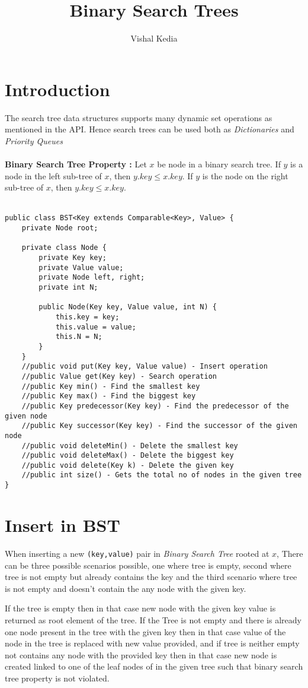 \documentclass[12pt,a4paper,draft]{article}
\author{Vishal Kedia}
\title{Binary Search Trees}
\begin{document}
\maketitle
\section{Introduction}
The search tree data structures supports many dynamic set operations as mentioned in the API. Hence search trees can be used both as \emph{Dictionaries} and \emph{Priority Queues}
\\
\\
\textbf{Binary Search Tree Property :} Let $x$ be node in a binary search tree. If $y$ is a node in the left sub-tree of $x$, then $y.key \leq x.key$. If $y$ is the node on the right sub-tree of $x$, then $y.key \leq x.key$.
\\
\\
\begin{lstlisting}[caption={Binary Search Tree API}]
public class BST<Key extends Comparable<Key>, Value> {
	private Node root;

	private class Node {
		private Key key;
		private Value value;
		private Node left, right;
		private int N;

		public Node(Key key, Value value, int N) {
			this.key = key;
			this.value = value;
			this.N = N;
		}
	}
	//public void put(Key key, Value value) - Insert operation
	//public Value get(Key key) - Search operation
	//public Key min() - Find the smallest key
	//public Key max() - Find the biggest key
	//public Key predecessor(Key key) - Find the predecessor of the given node
	//public Key successor(Key key) - Find the successor of the given node
	//public void deleteMin() - Delete the smallest key
	//public void deleteMax() - Delete the biggest key
	//public void delete(Key k) - Delete the given key
	//public int size() - Gets the total no of nodes in the given tree
}
\end{lstlisting}
\pagebreak
\section{Insert in BST}
When inserting a new \texttt{(key,value)} pair in \emph{Binary Search Tree} rooted at $x$, There can be three possible scenarios possible, one where tree is empty, second where tree is not empty but already contains the key and the third scenario where tree is not empty and doesn't contain the any node with the given key.
\par
If the tree is empty then in that case new node with the given key value is returned as root element of the tree. If the Tree is not empty and there is already one node present in the tree with the given key then in that case value of the node in the tree is replaced with new value provided, and if tree is neither empty not contains any node with the provided key then in that case new node is created linked to one of the leaf nodes of in the given tree such that binary search tree property is not violated.
\end{document}
